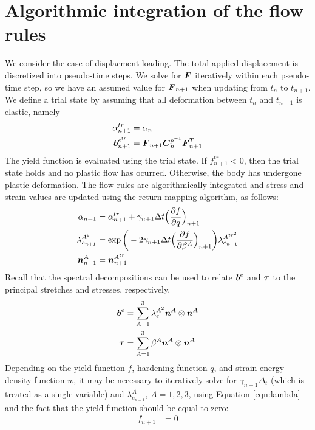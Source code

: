 \documentclass[10pt]{article}
\begin{document}
\section{Algorithmic integration of the flow rules}
We consider the case of displacment loading. The total applied displacement is discretized into pseudo-time steps. We solve for $\mbox{\boldmath$ F$}$ iteratively within each pseudo-time step, so we have an assumed value for $\mbox{\boldmath$ F$}_{n+1}$ when updating from $t_n$ to $t_{n+1}$. We define a trial state by assuming that all deformation between $t_n$ and $t_{n+1}$ is elastic, namely
\begin{align}
\alpha^{tr}_{n+1} &= \alpha_n\\
\mbox{\boldmath$ b$}^{e^{tr}}_{n+1} &= \mbox{\boldmath$ F$}_{n+1}\mbox{\boldmath$ C$}^{p^{-1}}_n\mbox{\boldmath$ F$}_{n+1}^T
\end{align}
The yield function is evaluated using the trial state. If $f_{n+1}^{tr} < 0$, then the trial state holds and no plastic flow has ocurred. Otherwise, the body has undergone plastic deformation. The flow rules are algorithmically integrated and stress and strain values are updated using the return mapping algorithm, as follows:
\begin{align}
\alpha_{n+1} &= \alpha_{n+1}^{tr} + \gamma_{n+1}\Delta t
\Big(\frac{\partial f}{\partial q}\Big)_{n+1}
\label{eqn:alpha}
\\
\lambda_{e_{n+1}}^{A^2} &= \exp\bigg(-2\gamma_{n+1}\Delta t
\Big(\frac{\partial f}{\partial \beta^A}\Big)_{n+1}\bigg)
\label{eqn:lambda}
\lambda_{e_{n+1}}^{A^{{tr}^2}}\\
\mbox{\boldmath$ n$}^A_{n+1} &= \mbox{\boldmath$ n$}^{A^{tr}}_{n+1}
\end{align}
Recall that the spectral decompositions can be used to relate $\mbox{\boldmath$ b$}^e$ and $\mbox{\boldmath$\tau$}$ to the principal stretches and stresses, respectively.
\begin{align}
\mbox{\boldmath$ b$}^e &= \sum_{A=1}^3 \lambda_e^{A^2} \mbox{\boldmath$ n$}^A \otimes \mbox{\boldmath$ n$}^A\\
\mbox{\boldmath$\tau$} &= \sum_{A=1}^3 \beta^A \mbox{\boldmath$ n$}^A \otimes \mbox{\boldmath$ n$}^A
\end{align}
Depending on the yield function $f$, hardening function $q$, and strain energy density function $w$, it may be necessary to iteratively solve for $\gamma_{n+1} \Delta_t$ (which is treated as a single variable) and $\lambda^A_{e_{n+1}}$, $A=1,2,3$, using Equation \ref{eqn:lambda} and the fact that the yield function should be equal to zero:
\begin{align}
f_{n+1} &= 0
\end{align}
\end{document}
